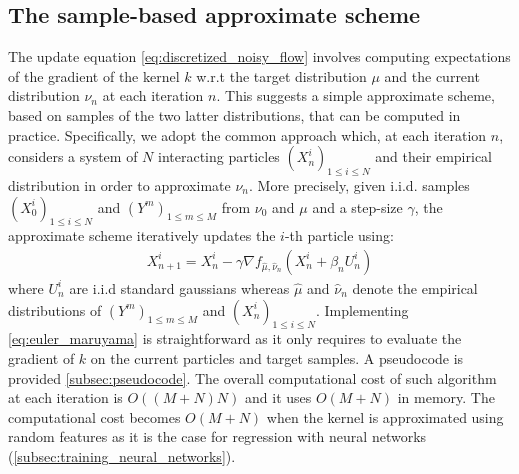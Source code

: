 
\subsection{The sample-based approximate scheme}\label{sec:sample_based}

The update equation \eqref{eq:discretized_noisy_flow} involves computing expectations of the gradient of the kernel $k$ w.r.t the target distribution $\mu$ and the current distribution $\nu_n$ at each iteration $n$. This suggests a simple approximate scheme, based on samples of the two latter distributions, that can be computed in practice. Specifically, we adopt the common approach %
which, at each iteration $n$, considers a system of $N$ interacting particles $(X_n^i)_{1\leq i\leq N}$  and their empirical distribution in order to approximate $\nu_n$. 
More precisely, given i.i.d. samples $(X^i_0)_{1\leq i\leq N}$ and $(Y^{m})_{1\leq m\leq M}$ from $\nu_0$ and $\mu$ and a step-size $\gamma$, the approximate scheme iteratively updates the $i$-th particle using: 
\begin{align}\label{eq:euler_maruyama}
X_{n+1}^{i} = X_n^i -\gamma \nabla f_{\hat{\mu},\hat{\nu}_n}(X_n^i+\beta_n U_n^i)
\end{align}
where $U_{n}^{i}$ are i.i.d standard gaussians whereas $\hat{\mu}$ and $\hat{\nu}_n$ denote the empirical distributions of $(Y^{m})_{1\leq m\leq M}$ and $(X^i_n)_{1\leq i\leq N}$. %
Implementing \cref{eq:euler_maruyama} is straightforward as it only requires to evaluate the gradient of $k$ on the current particles and target samples. A pseudocode is provided \cref{subsec:pseudocode}. 
The overall computational cost of such algorithm at each iteration is $O((M+N)N)$ and it uses $O(M+N)$ in memory. The computational cost becomes  $O(M+N)$ when the kernel is approximated using random features as it is the case for regression with neural networks (\cref{subsec:training_neural_networks}). 
